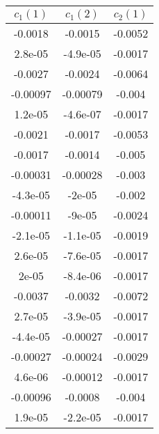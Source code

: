 \begin{tiny}\begin{tabular}{|c|c|c|}
\hline
\textbf{$c_1(1)$}&\textbf{$c_1(2)$}&\textbf{$c_2(1)$}\\\hline
-0.0018&-0.0015&-0.0052\\\hline
2.8e-05&-4.9e-05&-0.0017\\\hline
-0.0027&-0.0024&-0.0064\\\hline
-0.00097&-0.00079&-0.004\\\hline
1.2e-05&-4.6e-07&-0.0017\\\hline
-0.0021&-0.0017&-0.0053\\\hline
-0.0017&-0.0014&-0.005\\\hline
-0.00031&-0.00028&-0.003\\\hline
-4.3e-05&-2e-05&-0.002\\\hline
-0.00011&-9e-05&-0.0024\\\hline
-2.1e-05&-1.1e-05&-0.0019\\\hline
2.6e-05&-7.6e-05&-0.0017\\\hline
2e-05&-8.4e-06&-0.0017\\\hline
-0.0037&-0.0032&-0.0072\\\hline
2.7e-05&-3.9e-05&-0.0017\\\hline
-4.4e-05&-0.00027&-0.0017\\\hline
-0.00027&-0.00024&-0.0029\\\hline
4.6e-06&-0.00012&-0.0017\\\hline
-0.00096&-0.0008&-0.004\\\hline
1.9e-05&-2.2e-05&-0.0017\\\hline
\end{tabular}
\end{tiny}